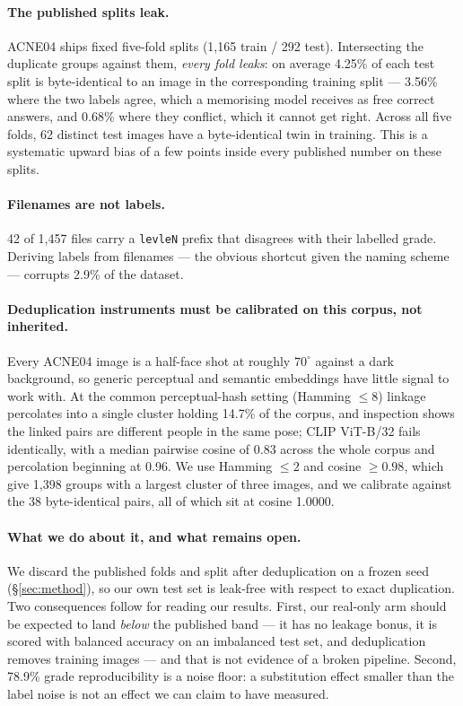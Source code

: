 \documentclass[11pt]{article}
\begin{document}
\paragraph{The published splits leak.}
ACNE04 ships fixed five-fold splits (1{,}165 train / 292 test). Intersecting the
duplicate groups against them, \emph{every fold leaks}: on average 4.25\% of each test
split is byte-identical to an image in the corresponding training split --- 3.56\%
where the two labels agree, which a memorising model receives as free correct answers,
and 0.68\% where they conflict, which it cannot get right. Across all five folds, 62
distinct test images have a byte-identical twin in training. This is a systematic
upward bias of a few points inside every published number on these splits.

\paragraph{Filenames are not labels.}
42 of 1{,}457 files carry a \texttt{levleN} prefix that disagrees with their labelled
grade. Deriving labels from filenames --- the obvious shortcut given the naming scheme
--- corrupts 2.9\% of the dataset.

\paragraph{Deduplication instruments must be calibrated on this corpus, not inherited.}
Every ACNE04 image is a half-face shot at roughly $70^\circ$ against a dark background,
so generic perceptual and semantic embeddings have little signal to work with. At the
common perceptual-hash setting (Hamming $\leq 8$) linkage percolates into a single
cluster holding 14.7\% of the corpus, and inspection shows the linked pairs are
different people in the same pose; CLIP ViT-B/32 fails identically, with a median
pairwise cosine of 0.83 across the whole corpus and percolation beginning at 0.96.
We use Hamming $\leq 2$ and cosine $\geq 0.98$, which give 1{,}398 groups with a
largest cluster of three images, and we calibrate against the 38 byte-identical pairs,
all of which sit at cosine 1.0000.

\paragraph{What we do about it, and what remains open.}
We discard the published folds and split after deduplication on a frozen seed
(\S\ref{sec:method}), so our own test set is leak-free with respect to exact
duplication. Two consequences follow for reading our results. First, our real-only arm
should be expected to land \emph{below} the published band --- it has no leakage bonus,
it is scored with balanced accuracy on an imbalanced test set, and deduplication
removes training images --- and that is not evidence of a broken pipeline. Second,
78.9\% grade reproducibility is a noise floor: a substitution effect smaller than the
label noise is not an effect we can claim to have measured.
\end{document}
